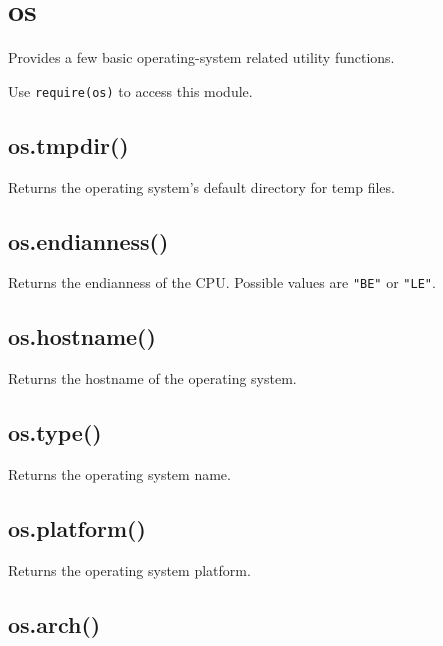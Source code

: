 \section{os}\label{os}

\begin{Shaded}
\begin{Highlighting}[]
 
\end{Highlighting}
\end{Shaded}

Provides a few basic operating-system related utility functions.

Use \texttt{require(\textquotesingle{}os\textquotesingle{})} to access
this module.

\subsection{os.tmpdir()}\label{os.tmpdir}

Returns the operating system's default directory for temp files.

\subsection{os.endianness()}\label{os.endianness}

Returns the endianness of the CPU. Possible values are \texttt{"BE"} or
\texttt{"LE"}.

\subsection{os.hostname()}\label{os.hostname}

Returns the hostname of the operating system.

\subsection{os.type()}\label{os.type}

Returns the operating system name.

\subsection{os.platform()}\label{os.platform}

Returns the operating system platform.

\subsection{os.arch()}\label{os.arch}

